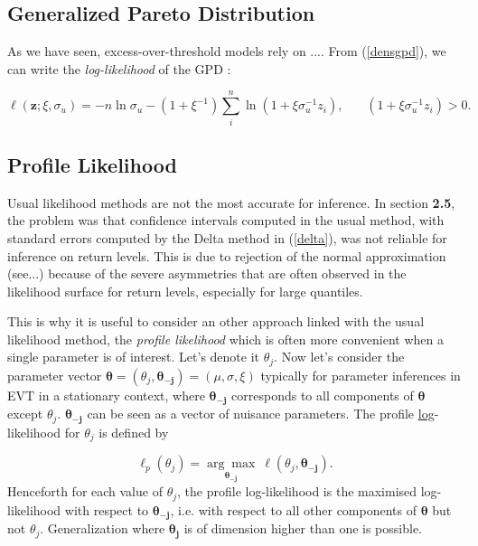 \documentclass[11pt,a4paper,openany ]{book}
\begin{document}
\subsection*{Generalized Pareto Distribution}

As we have seen, excess-over-threshold models rely on ....
From (\ref{densgpd}), we can write the \emph{log-likelihood }of the GPD : 

\begin{equation}\label{likk}
\ell(\textbf{z};\xi,\sigma_u) = -n\ln\sigma_u-(1+\xi^{-1})\sum_{i}^n\ln(1+\xi \sigma_u^{-1}z_i), \ \ \ \ \ \ \ \ (1+\xi \sigma_u^{-1}z_i)>0.
\end{equation}



\subsection{Profile Likelihood}

Usual likelihood methods are not the most accurate for inference. In section \textbf{2.5}, 
the problem was that confidence intervals computed in the usual method, with standard 
errors computed by the Delta method in (\ref{delta}), was not reliable for inference on 
return levels. This is due to rejection of the normal approximation (see...) because of the 
severe asymmetries that are often observed in the likelihood surface for return levels, 
especially for large quantiles.
\cite{bolivar_profile_2010}

This is why it is useful to consider an other approach linked with the usual likelihood method, the \emph{profile likelihood} which is often more convenient when a single parameter is of interest. Let's denote it $\theta_j$. Now let's consider the parameter vector $\boldsymbol{\theta}=(\theta_j,\boldsymbol{\theta_{-j}})= (\mu,\sigma,\xi)$ typically for parameter inferences in EVT in a stationary context, where $\boldsymbol{\theta_{-j}}$ corresponds to all components of $\boldsymbol{\theta}$ except $\theta_j$. $\boldsymbol{\theta_{-j}}$ can be seen as a vector of nuisance parameters.
The profile \underline{log}-likelihood for $\theta_j$ is defined by 

\begin{equation}
\ell_p(\theta_j)=\underset{\boldsymbol{\theta_{-j}}}{\mathrm{\arg\max}}\ \ell (\theta_j,\boldsymbol{\theta_{-j}}).
\end{equation}
Henceforth for each value of $\theta_j$, the profile log-likelihood is the maximised 
log-likelihood with respect to $\boldsymbol{\theta_{-j}}$, i.e. with respect to all other 
components of $\boldsymbol{\theta}$ but not $\theta_j$.
Generalization where $\boldsymbol{\theta_j}$ is of dimension higher than one is possible.
\end{document}
